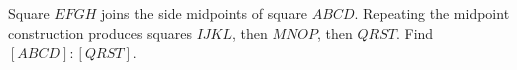 Square $EFGH$ joins the side midpoints of square $ABCD$. Repeating the midpoint construction produces squares $IJKL$, then $MNOP$, then $QRST$. Find $[ABCD]:[QRST]$.
